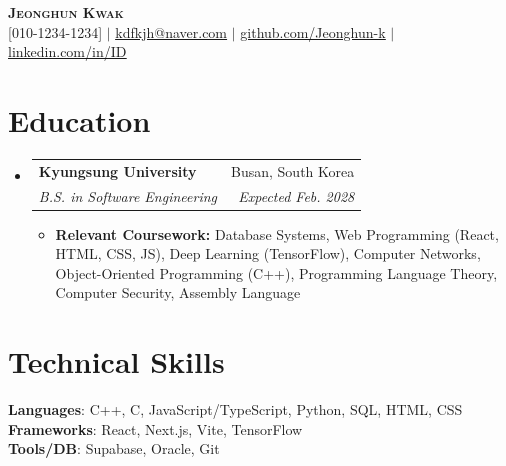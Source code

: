 \documentclass[letterpaper,11pt]{article}
\makeatletter
\newcommand{\resumeItem}[1]{
  \item\small{
    {#1 \vspace{-2pt}}
  }
}
\newcommand{\resumeSubheading}[4]{
  \vspace{-2pt}\item
    \begin{tabular*}{0.97\textwidth}[t]{l@{\extracolsep{\fill}}r}
      \textbf{#1} & #2 \\
      \textit{\small#3} & \textit{\small #4} \\
    \end{tabular*}\vspace{-7pt}
}
\newcommand{\resumeSubHeadingListStart}{\begin{itemize}[leftmargin=0.15in, label={}]}
\newcommand{\resumeSubHeadingListEnd}{\end{itemize}}
\newcommand{\resumeItemListStart}{\begin{itemize}}
\newcommand{\resumeItemListEnd}{\end{itemize}\vspace{-5pt}}
\makeatother
\begin{document}
\begin{center}
    \textbf{\Huge \scshape Jeonghun Kwak} \\ \vspace{1pt}
    \small [010-1234-1234] $|$ \href{mailto:you@email.com}{\underline{kdfkjh@naver.com}} $|$
    \href{https://github.com/ID}{\underline{github.com/Jeonghun-k}} $|$
    \href{https://linkedin.com/in/ID}{\underline{linkedin.com/in/ID}}
\end{center}

\section{Education}
  \resumeSubHeadingListStart
    \resumeSubheading
      {Kyungsung University}{Busan, South Korea}
      {B.S. in Software Engineering}{Expected Feb. 2028}
      \resumeItemListStart
        \resumeItem{\textbf{Relevant Coursework:} Database Systems, Web Programming (React, HTML, CSS, JS), Deep Learning (TensorFlow), Computer Networks, Object-Oriented Programming (C++), Programming Language Theory, Computer Security, Assembly Language}
      \resumeItemListEnd
  \resumeSubHeadingListEnd

\section{Technical Skills}
 \begin{itemize}[leftmargin=0.15in, label={}]
    \small{\item{
     \textbf{Languages}{: C++, C, JavaScript/TypeScript, Python, SQL, HTML, CSS} \\
     \textbf{Frameworks}{: React, Next.js, Vite, TensorFlow} \\
     \textbf{Tools/DB}{: Supabase, Oracle, Git}
    }}
 \end{itemize}

\end{document}
